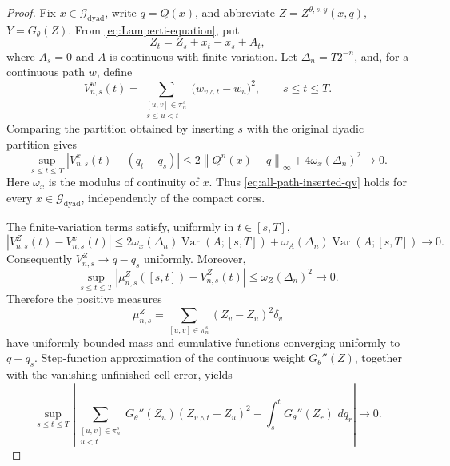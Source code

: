 \documentclass[11pt,reqno]{amsart}
\theoremstyle{plain}
\theoremstyle{definition}
\newcommand{\cG}{\mathcal G}
\newcommand{\dd}{\,d}
\newcommand{\Var}{\operatorname{Var}}
\newcommand{\norm}[1]{\left\lVert #1\right\rVert}
\begin{document}
\begin{proof}
Fix \(x\in\cG_{\mathrm{dyad}}\), write \(q=Q(x)\), and abbreviate
\(Z=Z^{\theta,s,y}(x,q)\), \(Y=G_\theta(Z)\).  From
\eqref{eq:Lamperti-equation}, put
\[
  Z_t=Z_s+x_t-x_s+A_t,
\]
where \(A_s=0\) and \(A\) is continuous with finite variation.  Let
\(\Delta_n=T2^{-n}\), and, for a continuous path \(w\), define
\[
  V_{n,s}^w(t)
  =
  \sum_{\substack{[u,v]\in\pi_n^s\\s\le u<t}}
    \bigl(w_{v\wedge t}-w_u\bigr)^2,
  \qquad s\le t\le T.
\]
Comparing the partition obtained by inserting \(s\) with the original
dyadic partition gives
\begin{equation}\label{eq:all-path-inserted-qv}
  \sup_{s\le t\le T}
  \left|
    V_{n,s}^x(t)-(q_t-q_s)
  \right|
  \le
  2\norm{Q^n(x)-q}_\infty+4\omega_x(\Delta_n)^2
  \longrightarrow0.
\end{equation}
Here \(\omega_x\) is the modulus of continuity of \(x\).  Thus
\eqref{eq:all-path-inserted-qv} holds for every
\(x\in\cG_{\mathrm{dyad}}\), independently of the compact cores.

The finite-variation terms satisfy, uniformly in \(t\in[s,T]\),
\[
  \left|V_{n,s}^Z(t)-V_{n,s}^x(t)\right|
  \le
  2\omega_x(\Delta_n)\Var(A;[s,T])
  +\omega_A(\Delta_n)\Var(A;[s,T])
  \longrightarrow0.
\]
Consequently \(V_{n,s}^Z\to q-q_s\) uniformly.  Moreover,
\[
  \sup_{s\le t\le T}
  \left|
    \mu_{n,s}^Z([s,t])-V_{n,s}^Z(t)
  \right|
  \le \omega_Z(\Delta_n)^2\longrightarrow0.
\]
Therefore the positive measures
\[
  \mu_{n,s}^Z
  =\sum_{[u,v]\in\pi_n^s}(Z_v-Z_u)^2\delta_v
\]
have uniformly bounded mass and cumulative functions converging uniformly to
\(q-q_s\).  Step-function approximation of the continuous weight
\(G_\theta''(Z)\), together with the vanishing unfinished-cell error, yields
\begin{equation}\label{eq:all-path-weighted-qv}
  \sup_{s\le t\le T}
  \left|
    \sum_{\substack{[u,v]\in\pi_n^s\\u<t}}
      G_\theta''(Z_u)(Z_{v\wedge t}-Z_u)^2
    -\int_s^tG_\theta''(Z_r)\,\dd q_r
  \right|
  \longrightarrow0.
\end{equation}


\end{proof}
\end{document}
